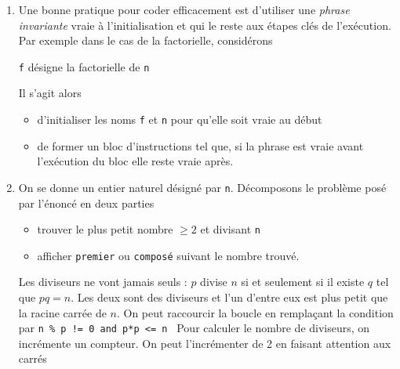 \begin{enumerate}
  \item Une bonne pratique pour coder efficacement est d'utiliser une \emph{phrase invariante} vraie à l'initialisation et qui le reste aux étapes clés de l'exécution. Par exemple dans le cas de la factorielle, considérons 
\begin{center}
  \og \texttt{f} désigne la factorielle de \texttt{n} \fg
\end{center}
Il s'agit alors
\begin{itemize}
  \item d'initialiser les noms \texttt{f} et \texttt{n} pour qu'elle soit vraie au début
  \item de former un bloc d'instructions tel que, si la phrase est vraie avant l'exécution du bloc elle reste vraie après.
\end{itemize}


\item On se donne un entier naturel désigné par \texttt{n}. Décomposons le problème posé par l'énoncé en deux parties
\begin{itemize}
  \item trouver le plus petit nombre $\geq 2$ et divisant \texttt{n}
  \item afficher \texttt{premier} ou \texttt{composé} suivant le nombre trouvé. 
\end{itemize}

Les diviseurs ne vont jamais seuls : $p$ divise $n$ si et seulement si il existe $q$ tel que $pq=n$. Les deux sont des diviseurs et l'un d'entre eux est plus petit que la racine carrée de $n$. 
On peut raccourcir la boucle en remplaçant la condition par \texttt{n \% p != 0 and p*p <= n }\newline
Pour calculer le nombre de diviseurs, on incrémente un compteur. On peut l'incrémenter de 2 en faisant attention aux carrés



\end{enumerate}
